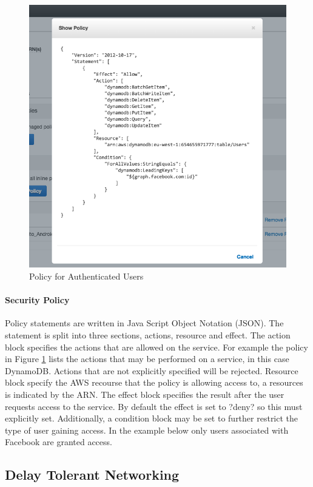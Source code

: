 \documentclass[a4paper, 11pt]{article}
\begin{document}
\begin{figure}[t]
\centering
\includegraphics[width=\textwidth]{iam_policy.png}
\caption{Policy for Authenticated Users}\label{fig:iam}
\end{figure}

\paragraph{Security Policy}Policy statements are written in Java Script Object Notation (JSON). The statement is split into three sections, actions, resource and effect. The action block specifies the actions that are allowed on the service. For example the policy in Figure \ref{fig:iam} lists the actions that may be performed on a service, in this case DynamoDB. Actions that are not explicitly specified will be rejected. Resource block specify the AWS recourse that the policy is allowing access to, a resources is indicated by the ARN. The effect block specifies the result after the user requests access to the service. By default the effect is set to ?deny? so this must explicitly set. Additionally, a condition block may be set to further restrict the type of user gaining access. In the example below only users associated with Facebook are granted access.

\subsection{Delay Tolerant Networking}
\end{document}
